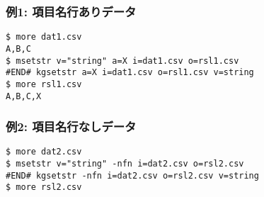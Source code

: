 \subsubsection*{例1: 項目名行ありデータ}



\begin{Verbatim}[baselinestretch=0.7,frame=single]
$ more dat1.csv
A,B,C
$ msetstr v="string" a=X i=dat1.csv o=rsl1.csv
#END# kgsetstr a=X i=dat1.csv o=rsl1.csv v=string
$ more rsl1.csv
A,B,C,X
\end{Verbatim}
\subsubsection*{例2: 項目名行なしデータ}



\begin{Verbatim}[baselinestretch=0.7,frame=single]
$ more dat2.csv
$ msetstr v="string" -nfn i=dat2.csv o=rsl2.csv
#END# kgsetstr -nfn i=dat2.csv o=rsl2.csv v=string
$ more rsl2.csv
\end{Verbatim}
